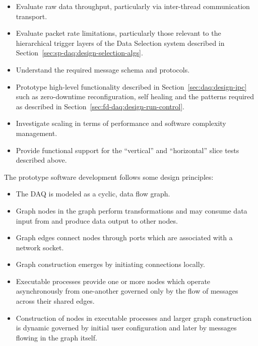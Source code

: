 \begin{itemize}
\item Evaluate raw data throughput, particularly via inter-thread communication transport.
\item Evaluate packet rate limitations, particularly those relevant to the hierarchical trigger layers of the Data Selection system described in Section~\ref{sec:sp-daq:design-selection-algs}.
\item Understand the required message schema and protocols.
\item Prototype high-level functionality described in Section~\ref{sec:daq:design-ipc} such as zero-downtime reconfiguration, self healing and the patterns required  as described in Section~\ref{sec:fd-daq:design-run-control}.
\item Investigate scaling in terms of performance and software complexity management.
\item Provide functional support for the ``vertical'' and ``horizontal'' slice tests described above.
\end{itemize}

The prototype software development follows some design principles:

\begin{itemize}
\item The DAQ is modeled as a cyclic, data flow graph.
\item Graph nodes in the graph perform transformations and may consume data input from and produce data output to other nodes.
\item Graph edges connect nodes through ports which are associated with a network socket.
\item Graph construction emerges by initiating connections locally.
\item Executable processes provide one or more nodes which operate asynchronously from one-another governed only by the flow of messages across their shared edges.
\item Construction of nodes in executable processes and larger graph construction is dynamic governed by initial user configuration and later by messages flowing in the graph itself.
\end{itemize}

